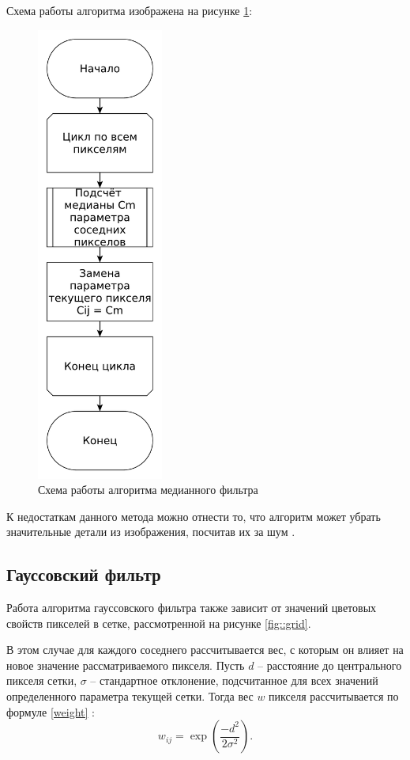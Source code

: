Схема работы алгоритма изображена на рисунке \ref{fig::median}:
\FloatBarrier
\begin{figure}[h]	
	\begin{center}
		\includegraphics[height=15cm]{inc/pdf/median.pdf}
	\end{center}
	\captionsetup{justification=centering}
	\caption{Схема работы алгоритма медианного фильтра}
	\label{fig::median}
\end{figure}
\FloatBarrier

К недостаткам данного метода можно отнести то, что алгоритм может убрать значительные детали из изображения, посчитав их за шум \cite{median2}. 


\subsection{Гауссовский фильтр}
Работа алгоритма гауссовского фильтра также зависит от значений цветовых свойств пикселей в сетке, рассмотренной на рисунке \ref{fig::grid}.

В этом случае для каждого соседнего рассчитывается вес, с которым он влияет на новое значение рассматриваемого пикселя. 
Пусть $d$ -- расстояние до центрального пикселя сетки, $\sigma$ -- стандартное отклонение, подсчитанное для всех значений определенного параметра текущей сетки.
Тогда вес $w$ пикселя рассчитывается по формуле \eqref{weight} \cite{filterTechincs}:
\begin{equation}
	\label{weight}
	w_{ij} = \exp\left(\frac{-d^2}{2\sigma^2}\right).
\end{equation}

